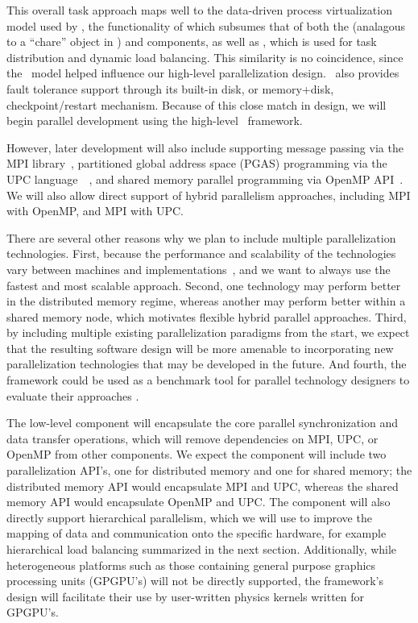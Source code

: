 \documentclass[10pt,twocolumn]{article}
\begin{document}
This overall task approach maps well to the data-driven process
virtualization model used by \charm, the functionality of which
subsumes that of both the  (analagous to a ``chare'' object
in \charm) and  components, as well as
, which is used for task distribution and dynamic
load balancing.  This similarity is no coincidence, since the \charm\
model helped influence our high-level parallelization design.  \charm\
also provides fault tolerance support through its built-in disk, or
memory+disk, checkpoint/restart mechanism.  Because of this close
match in design, we will begin parallel development using the
high-level \charm\ framework.

However, later development will also include supporting message
passing via the MPI library~\cite{wwwmpi}, partitioned global address
space (PGAS) programming via the UPC
language~\cite{wwwupc}~\cite{upc}, and shared memory parallel
programming via OpenMP API~\cite{wwwopenmp}.  We will also allow
direct support of hybrid parallelism approaches, including MPI with
OpenMP, and MPI with UPC. 

There are several other reasons why we plan to include multiple
parallelization technologies.  First, because the performance and
scalability of the technologies vary between machines and
implementations~\cite{MaTa09}, and we want to always use the fastest
and most scalable approach.  Second, one technology may perform better
in the distributed memory regime, whereas another may perform better
within a shared memory node, which motivates flexible hybrid parallel
approaches.  Third, by including multiple existing parallelization
paradigms from the start, we expect that the resulting software design
will be more amenable to incorporating new parallelization
technologies that may be developed in the future.  And fourth, the
framework could be used as a benchmark tool for parallel technology
designers to evaluate their approaches \cite{WeSu07}.

The low-level  component will encapsulate the core
parallel synchronization and data transfer operations, which will
remove dependencies on MPI, UPC, or OpenMP from other components.  We
expect the \code{Parallel} component will include two parallelization
API's, one for distributed memory and one for shared memory; the
distributed memory API would encapsulate MPI and UPC, whereas the
shared memory API would encapsulate OpenMP and UPC.  The
\code{Parallel} component will also directly support hierarchical
parallelism, which we will use to improve the mapping of data and
communication onto the specific hardware, for example hierarchical
load balancing summarized in the next section.  Additionally, while
heterogeneous platforms such as those containing general purpose
graphics processing units (GPGPU's) will not be directly supported,
the framework's design will facilitate their use by user-written
physics kernels written for GPGPU's.
\end{document}
